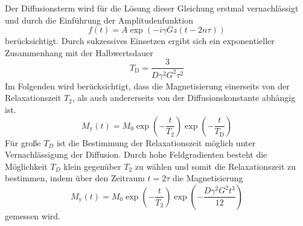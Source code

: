Der Diffusionsterm wird für die Lösung dieser Gleichung erstmal vernachlässigt
und durch die Einführung der Amplitudenfunktion
\begin{equation}
		f(t) = A \exp \left( -i \gamma Gz ( t -2n\tau) \right)
\end{equation}
berücksichtigt. Durch sukzessives Einsetzen ergibt sich ein exponentieller
Zusammenhang mit der Halbwertsdauer
\begin{equation}%
  \label{eq:diffkoef}
  T_\text{D} = \frac{3}{D \gamma^2 G^2 \tau^2}
\end{equation}
Im Folgenden wird berücksichtigt, dass die Magnetisierung einerseits von der
Relaxationszeit $T_2$, als auch andererseits von der Diffusionskonstante abhängig ist.
\begin{equation}
		\label{eq:my}
		M_\text{y}(t) = M_0 \exp \left( - \frac{t}{T_2} \right) \exp \left( -
		\frac{t}{T_\text{D}} \right)
\end{equation}
Für große $T_D$ ist die Bestimmung der Relaxationszeit möglich unter
Vernachlässigung der Diffusion.
Durch hohe Feldgradienten besteht die Möglichkeit $T_D$ klein gegenüber $T_2$
zu wählen und somit die Relaxationszeit zu bestimmen, indem über den Zeitraum
$t = 2\tau$ die Magnetisierung
\begin{equation}
		\label{eq:magy}
		M_\text{y}(t) = M_0 \exp \left( - \frac{t}{T_2} \right) \exp \left( -
		\frac{D \gamma^2 G^2 t^3}{12} \right)
\end{equation}
gemessen wird.
